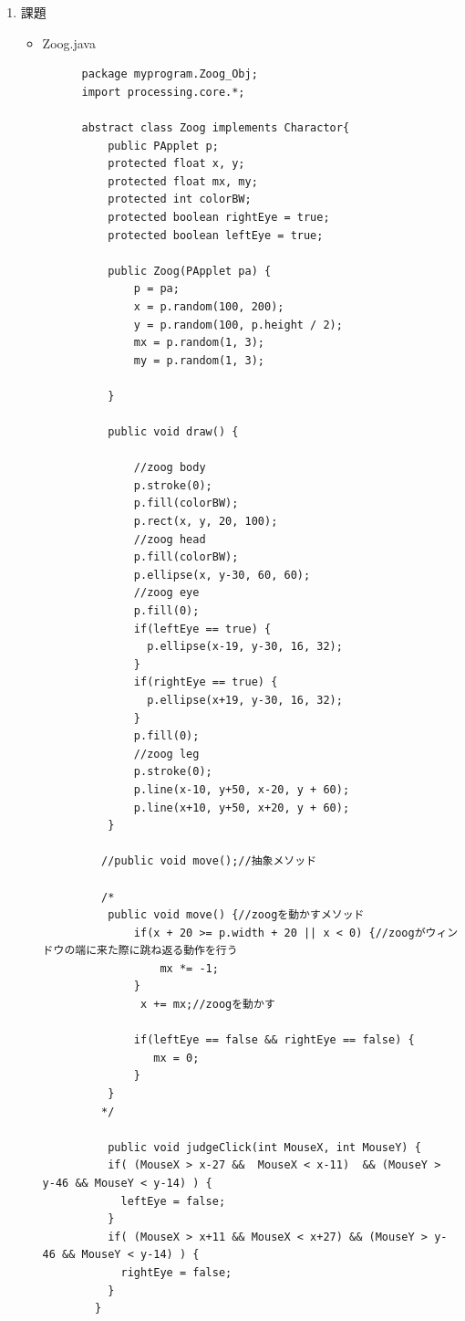 \documentclass[dvipdfmx]{jsarticle}
\begin{document}
\begin{enumerate}
  \item 課題
  \begin{itemize}
    \item Zoog.java
    \begin{verbatim}
      package myprogram.Zoog_Obj;
      import processing.core.*;

      abstract class Zoog implements Charactor{
          public PApplet p;
          protected float x, y;
          protected float mx, my;
          protected int colorBW;
          protected boolean rightEye = true;
          protected boolean leftEye = true;

          public Zoog(PApplet pa) {
              p = pa;
              x = p.random(100, 200);
              y = p.random(100, p.height / 2);
              mx = p.random(1, 3);
              my = p.random(1, 3);

          }

          public void draw() {

              //zoog body
              p.stroke(0);
              p.fill(colorBW);
              p.rect(x, y, 20, 100);
              //zoog head
              p.fill(colorBW);
              p.ellipse(x, y-30, 60, 60);
              //zoog eye
              p.fill(0);
              if(leftEye == true) {
                p.ellipse(x-19, y-30, 16, 32);
              }
              if(rightEye == true) {
                p.ellipse(x+19, y-30, 16, 32);
              }
              p.fill(0);
              //zoog leg
              p.stroke(0);
              p.line(x-10, y+50, x-20, y + 60);
              p.line(x+10, y+50, x+20, y + 60);
          }

         //public void move();//抽象メソッド

         /*
          public void move() {//zoogを動かすメソッド
              if(x + 20 >= p.width + 20 || x < 0) {//zoogがウィンドウの端に来た際に跳ね返る動作を行う
                  mx *= -1;
              }
               x += mx;//zoogを動かす

              if(leftEye == false && rightEye == false) {
                 mx = 0;
              }
          }
         */

          public void judgeClick(int MouseX, int MouseY) {
          if( (MouseX > x-27 &&  MouseX < x-11)  && (MouseY > y-46 && MouseY < y-14) ) {
            leftEye = false;
          }
          if( (MouseX > x+11 && MouseX < x+27) && (MouseY > y-46 && MouseY < y-14) ) {
            rightEye = false;
          }
        }


\end{verbatim}
\end{itemize}
\end{enumerate}
\end{document}
